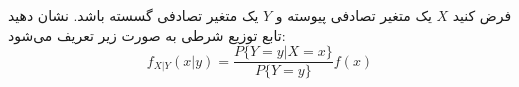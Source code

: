 \problem{}
فرض کنید $X$ یک متغیر تصادفی پیوسته و $Y$ 
یک متغیر تصادفی گسسته باشد. نشان دهید تابع توزیع شرطی به صورت زیر تعریف می‌شود:
\[
f_{X|Y}(x|y) =
\frac{P\{Y = y|X = x\}}{P\{Y = y\}} f(x)
\]
